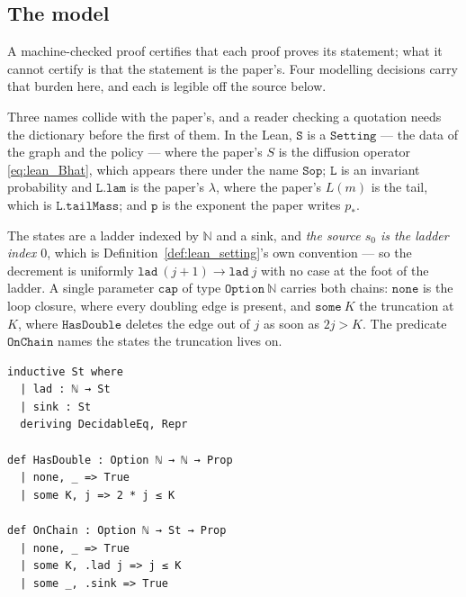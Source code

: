 \subsection{The model}\label{sec:lean_model}

A machine-checked proof certifies that each proof proves its statement; what it cannot certify
is that the statement is the paper's. Four modelling decisions carry that burden here, and each
is legible off the source below.

Three names collide with the paper's, and a reader checking a quotation needs the dictionary
before the first of them. In the Lean, $\texttt{S}$ is a $\texttt{Setting}$ --- the data of the
graph and the policy --- where the paper's $S$ is the diffusion operator \eqref{eq:lean_Bhat},
which appears there under the name $\texttt{Sop}$; $\texttt{L}$ is an invariant probability and
$\texttt{L.lam}$ is the paper's $\lambda$, where the paper's $L(m)$ is the tail, which is
$\texttt{L.tailMass}$; and $\texttt{p}$ is the exponent the paper writes $p_*$.

The states are a ladder indexed by $\mathbb N$ and a sink, and \emph{the source $s_0$ is the
ladder index $0$}, which is Definition~\ref{def:lean_setting}'s own convention --- so the
decrement is uniformly $\texttt{lad}\ (j+1)\rightarrow\texttt{lad}\ j$ with no case at the foot
of the ladder. A single parameter $\texttt{cap}$ of type $\texttt{Option}\ \mathbb N$ carries
both chains: $\texttt{none}$ is the loop closure, where every doubling edge is present, and
$\texttt{some}\ K$ the truncation at $K$, where $\texttt{HasDouble}$ deletes the edge out of $j$
as soon as $2j>K$. The predicate $\texttt{OnChain}$ names the states the truncation lives on.
\begin{lstlisting}[style=lean]
inductive St where
  | lad : ℕ → St
  | sink : St
  deriving DecidableEq, Repr

def HasDouble : Option ℕ → ℕ → Prop
  | none, _ => True
  | some K, j => 2 * j ≤ K

def OnChain : Option ℕ → St → Prop
  | none, _ => True
  | some K, .lad j => j ≤ K
  | some _, .sink => True
\end{lstlisting}

